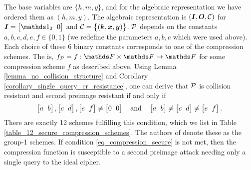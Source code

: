 \begin{pchstack}[center,space=2cm]
\end{pchstack}
The base variables are $\{h, m, y\}$, and for the algebraic representation we have ordered them as $(h, m, y)$.
The algebraic representation is $(\I, \O, \C)$ for $\I = \m{\Id_2 & 0}$ and $\C = \big\{(\vk, \vx, \vy) \big\}$.
$\P$ depends on the constants $a,b,c,d,e,f \in \{0,1\}$ (we redefine the parameters $a,b,c$ which were used above).
Each choice of these 6 binary constants corresponds to one of the compression schemes.
The is, $f_\P = f:\F \times \F \to \F$ for some compression scheme $f$ as described above.
% 
Using Lemma \ref{lemma_no_collision_structure} and Corollary \ref{corollary_single_query_cr_resistance},
one can derive that $\P$ is collision resistant and second preimage resistant if and only if
\begin{equation}
\label{eq_compression_secure}
    \m{a&b}, \m{c&d}, \m{e&f} \neq \m{0&0} \quad \textrm{and}\quad \m{a&b} \neq\m{c&d} \neq \m{e&f}.
\end{equation}
There are exactly 12 schemes fulfilling this condition,
which we list in Table \ref{table_12_secure_compression_schemes}.
The authors of \cite{C:BlaRogShr02} denote these as the group-1 schemes.
If condition \eqref{eq_compression_secure} is not met,
then the compression function is susceptible to a second preimage attack needing only a single query to the ideal cipher.

